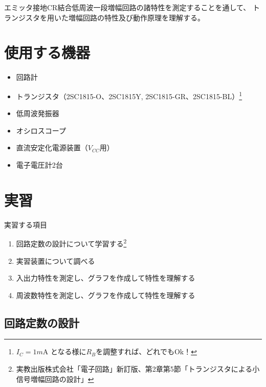 \documentclass[uplatex,a4paper,11pt,oneside,openany]{jsbook}
\begin{document}
エミッタ接地CR結合低周波一段増幅回路の諸特性を測定することを通して、
トランジスタを用いた増幅回路の特性及び動作原理を理解する。

\section{使用する機器}

\begin{itemize}
\item 回路計
\item トランジスタ（2SC1815-O、2SC1815Y, 2SC1815-GR、2SC1815-BL）\footnote{$I_C=1m$A となる様に$R_B$を調整すれば、どれでもOk！}
\item 低周波発振器
\item オシロスコープ
\item 直流安定化電源装置（$V_{CC}$用）
\item 電子電圧計2台
\end{itemize}

\section{実習}

実習する項目
\begin{enumerate}
\item[(1)] 回路定数の設計について学習する\footnote{実教出版株式会社「電子回路」新訂版、第2章第5節「トランジスタによる小信号増幅回路の設計」}
\item[(2)] 実習装置について調べる
\item[(3)] 入出力特性を測定し、グラフを作成して特性を理解する
\item[(4)] 周波数特性を測定し、グラフを作成して特性を理解する
\end{enumerate}

\newpage

\subsection{回路定数の設計}
\end{document}
